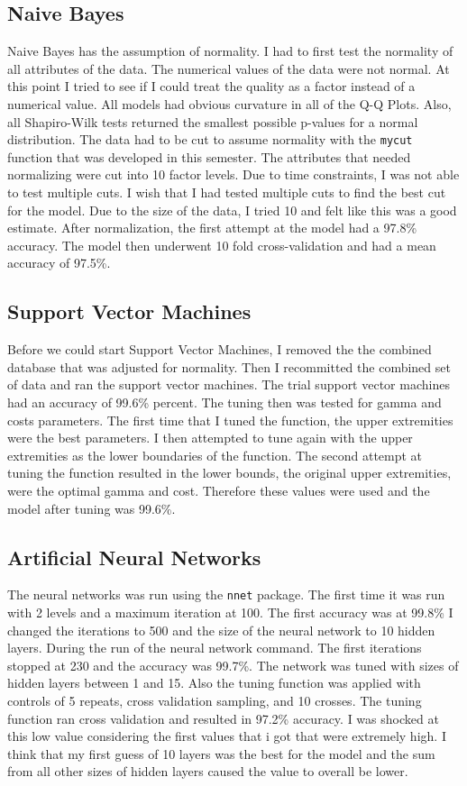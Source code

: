 \documentclass[letterpaper]{article}\usepackage[]{graphicx}\usepackage[]{color}
\begin{document}
\subsection*{Naive Bayes}
Naive Bayes has the assumption of normality. I had to first test the normality of all attributes of the data. The numerical values of the data were not normal. At this point I tried to see if I could treat the quality as a factor instead of a numerical value. All models had obvious curvature in all of the 	Q-Q Plots. Also, all Shapiro-Wilk tests returned the smallest possible p-values for a normal distribution. The data had to be cut to assume normality with the \texttt{mycut} function that was developed in this semester. The attributes that needed normalizing were cut into 10 factor levels. Due to time constraints, I was not able to test multiple cuts. I wish that I had tested multiple cuts to find the best cut for the model. Due to the size of the data, I tried 10 and felt like this was a good estimate. After normalization, the first attempt at the model had a 97.8\% accuracy. The model then underwent 10 fold cross-validation and had a mean accuracy of 97.5\%.

\subsection*{Support Vector Machines}
Before we could start Support Vector Machines, I removed the the combined database that was adjusted for normality. Then I recommitted the combined set of data and ran the support vector machines. The trial support vector machines had an accuracy of 99.6\% percent. The tuning then was tested for gamma and costs parameters. The first time that I tuned the function, the upper extremities were the best parameters. I then attempted to tune again with the upper extremities as the lower boundaries of the function. The second attempt at tuning the function resulted in the lower bounds, the original upper extremities, were the optimal gamma and cost. Therefore these values were used and the model after tuning was 99.6\%.

\subsection*{Artificial Neural Networks}
The neural networks was run using the \texttt{nnet} package. The first time it was run with 2 levels and a maximum iteration at 100. The first accuracy was at 99.8\% I changed the iterations to 500 and the size of the neural network to 10 hidden layers. During the run of the neural network command. The first iterations stopped at 230 and the accuracy was 99.7\%. The network was tuned with sizes of hidden layers between 1 and 15. Also the tuning function was applied with controls of 5 repeats, cross validation sampling, and 10 crosses. The tuning function ran cross validation and resulted in 97.2\% accuracy. I was shocked at this low value considering the first values that i got that were extremely high. I think that my first guess of 10 layers was the best for the model and the sum from all other sizes of hidden layers caused the value to overall be lower.
\end{document}
